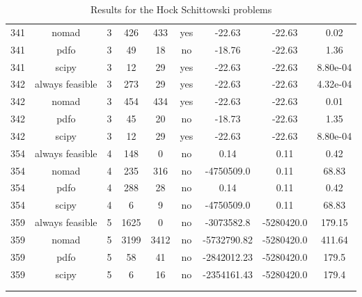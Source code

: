 \begin{footnotesize}
\begin{center}
\begin{longtable}{ccccccccc}
341 &           nomad &  3 &    426 &    433 &     yes &      -22.63 &      -22.63 &     0.02\\
341 &            pdfo &  3 &     49 &     18 &      no &      -18.76 &      -22.63 &     1.36\\
341 &           scipy &  3 &     12 &     29 &     yes &      -22.63 &      -22.63 & 8.80e-04\\
342 & always feasible &  3 &    273 &     29 &     yes &      -22.63 &      -22.63 & 4.32e-04\\
342 &           nomad &  3 &    454 &    434 &     yes &      -22.63 &      -22.63 &     0.01\\
342 &            pdfo &  3 &     45 &     20 &      no &      -18.73 &      -22.63 &     1.35\\
342 &           scipy &  3 &     12 &     29 &     yes &      -22.63 &      -22.63 & 8.80e-04\\
354 & always feasible &  4 &    148 &      0 &      no &        0.14 &        0.11 &     0.42\\
354 &           nomad &  4 &    235 &    316 &      no &  -4750509.0 &        0.11 &    68.83\\
354 &            pdfo &  4 &    288 &     28 &      no &        0.14 &        0.11 &     0.42\\
354 &           scipy &  4 &      6 &      9 &      no &  -4750509.0 &        0.11 &    68.83\\
359 & always feasible &  5 &   1625 &      0 &      no &  -3073582.8 &  -5280420.0 &   179.15\\
359 &           nomad &  5 &   3199 &   3412 &      no & -5732790.82 &  -5280420.0 &   411.64\\
359 &            pdfo &  5 &     58 &     41 &      no & -2842012.23 &  -5280420.0 &    179.5\\
359 &           scipy &  5 &      6 &     16 &      no & -2354161.43 &  -5280420.0 &    179.4\\
\caption{Results for the Hock Schittowski problems} \\
\label{nonlinear_results}
\end{longtable}
\end{center}
\end{footnotesize}




